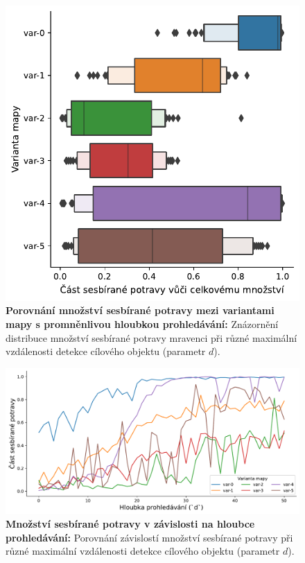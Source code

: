 \documentclass[10pt,a4paper,twocolumn]{article}
\begin{document}
\begin{figure}[tb]
  \centering
  \includegraphics[width=0.98\linewidth]{images/search_depth_variants_means.pdf}
  \caption{\textbf{Porovnání množství sesbírané potravy mezi variantami mapy s promněnlivou hloubkou prohledávání:}
  Znázornění distribuce množství sesbírané potravy mravenci 
  při různé maximální vzdálenosti detekce cílového objektu (parametr $d$).}
  \label{fig:search_depth_means}
\end{figure}

\begin{figure}[tb]
  \centering
  \includegraphics[width=0.98\linewidth]{images/search_depth_variants_together.pdf}
  \caption{\textbf{Množství sesbírané potravy v závislosti na hloubce prohledávání:}
  Porovnání závislostí množství sesbírané potravy 
  při různé maximální vzdálenosti detekce cílového objektu (parametr $d$).}
  \label{fig:search_depth_together}
\end{figure}
\end{document}
